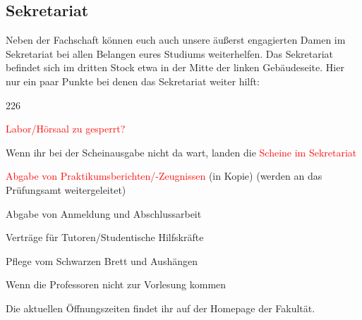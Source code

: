 \subsection{Sekretariat}
Neben der Fachschaft können euch auch unsere äußerst engagierten 
Damen im Sekretariat bei allen Belangen eures Studiums weiterhelfen. 
Das Sekretariat befindet sich im dritten Stock etwa in der Mitte der 
linken Gebäudeseite. 
Hier nur ein paar Punkte bei denen das Sekretariat weiter hilft:
\begin{dinglist}{226}
\item \textcolor{red}{Labor/Hörsaal zu gesperrt?} 
\item Wenn ihr bei der Scheinausgabe nicht da wart, landen die \textcolor{red}{Scheine im Sekretariat}	
\item \textcolor{red}{Abgabe von Praktikumsberichten/-Zeugnissen} (in Kopie) (werden an das Prüfungsamt weitergeleitet) 
\item Abgabe von Anmeldung und Abschlussarbeit 
\item Verträge für Tutoren/Studentische Hilfskräfte 
\item Pflege vom Schwarzen Brett und Aushängen 
\item Wenn die Professoren nicht zur Vorlesung kommen
\end{dinglist}
Die aktuellen Öffnungszeiten findet ihr auf der Homepage der Fakultät. 